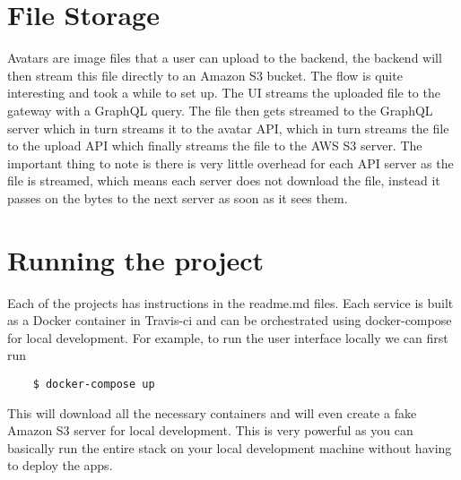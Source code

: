 \section{File Storage}

Avatars are image files that a user can upload to the backend, the backend will then stream this file directly to an Amazon S3 bucket. The flow is quite interesting and took a while to set up. The UI streams the uploaded file to the gateway with a GraphQL query. The file then gets streamed to the GraphQL server which in turn streams it to the avatar API, which in turn streams the file to the upload API which finally streams the file to the AWS  S3 server. The important thing to note is there is very little overhead for each API server as the file is streamed, which means each server does not download the file, instead it passes on the bytes to the next server as soon as it sees them. 

\section{Running the project}

Each of the projects has instructions in the readme.md files. Each service is built as a Docker container in Travis-ci and can be orchestrated using docker-compose for local development. For example, to run the user interface locally we can first run 

\begin{verbatim}
	$ docker-compose up
\end{verbatim}
This will download all the necessary containers and will even create a fake Amazon S3 server for local development. This is very powerful as you can basically run the entire stack on your local development machine without having to deploy the apps. 